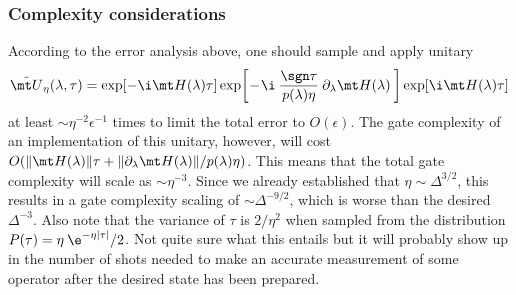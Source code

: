 \subsubsection{Complexity considerations}
According to the error analysis above, one should sample and apply unitary
\begin{align}
    \tilde{\mt U}_\eta(\lambda, \tau) = \exp[-\i \mt H(\lambda) \tau] \exp \! \bigg[ \!-\!\i \> \frac{\sgn\tau}{p(\lambda)\eta} \> \partial_\lambda \mt H(\lambda)\> \bigg] \exp[\i \mt H(\lambda)\tau]
\end{align}
at least $\sim \eta^{-2}\epsilon^{-1}$ times to limit the total error to $O(\epsilon)$. The gate complexity of an implementation of this unitary, however, will cost $O(\|\mt H(\lambda)\|\tau + \|\partial_\lambda \mt H(\lambda)\| / p(\lambda) \eta)$. This means that the total gate complexity will scale as $\sim \eta^{-3}$. Since we already established that $\eta \sim \Delta^{3/2}$, this results in a gate complexity scaling of $\sim \Delta^{-9/2}$, which is worse than the desired $\Delta^{-3}$. Also note that the variance of $\tau$ is $2 / \eta^2$ when sampled from the distribution $P(\tau) = \eta \> \e^{-\eta|\tau|} / 2$. Not quite sure what this entails but it will probably show up in the number of shots needed to make an accurate measurement of some operator after the desired state has been prepared.